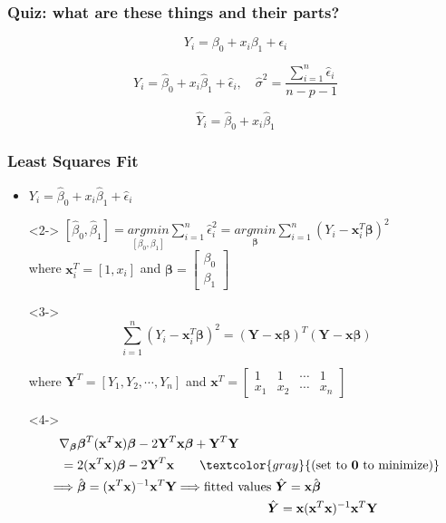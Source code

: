 \documentclass[xcolor={dvipsnames}]{beamer}
\begin{document}
\frame
{
 \frametitle{Quiz: what are these things and their parts?}
 \huge
$$ Y_i = \beta_0 + x_i \beta_1 + \epsilon_i $$

$$ Y_i = \hat \beta_0 + x_i \hat \beta_1 + \hat \epsilon_i, \quad \hat \sigma^2 = \frac{\sum_{i=1}^n \hat \epsilon_i}{n-p-1}$$

$$ \hat Y_i = \hat \beta_0 + x_i \hat \beta_1 $$

}

\frame
{
 \frametitle{Least Squares Fit}

\begin{itemize}

\item $ Y_i = \hat\beta_0 + x_i\hat\beta_1 + \hat \epsilon_i$
\item[] 
\item[]<2->  $[\hat \beta_0,\hat \beta_1] = \underset{[\beta_0, \beta_1]}{argmin} \sum_{i=1}^n \hat \epsilon_i^2 = 
\underset{{\boldsymbol\beta}}{argmin} \sum_{i=1}^n (Y_i - \textbf{x}_i^T{\boldsymbol\beta})^2$\\
\footnotesize
where $\textbf{x}_i^T = [1,x_i]$ and $\textbf{${\boldsymbol\beta}$} = \left[\begin{array}{c} \beta_0\\ \beta_1\end{array}\right]$

\item[]<3-> 
$$\sum_{i=1}^n ( Y_i - \textbf{x}_i^T{\boldsymbol\beta})^2 = (\textbf{Y} - \textbf{x}{\boldsymbol\beta})^T(\textbf{Y} - \textbf{x}{\boldsymbol\beta})$$

\footnotesize
where $\textbf{Y}^T =  [Y_1,Y_2,\cdots,Y_n]$ and $\textbf{x}^T =  \left[\begin{array}{cccc}1&1&\cdots&1\\x_1&x_2&\cdots&x_n \end{array}\right]$

\item[]<4-> \begin{align*}
\nabla_{{\boldsymbol\beta}} {} & {\boldsymbol\beta}^T(\textbf{x}^T\textbf{x}) {\boldsymbol\beta}  -2 \textbf{Y}^T \textbf{x}{\boldsymbol\beta}   + \textbf{Y}^T\textbf{Y}\\
=  {} &2 (\textbf{x}^T\textbf{x}) {\boldsymbol\beta}  - 2 \textbf{Y}^T\textbf{x} \quad\quad \textcolor{gray}{\text{(set to \textbf{0} to minimize)}}\\ 
\Longrightarrow {} & \hat{\boldsymbol\beta}  = (\textbf{x}^T\textbf{x})^{-1}  \textbf{x}^T\textbf{Y} \Longrightarrow 
\text{fitted values } \hat {\boldsymbol Y}  =  \textbf{x}\hat {\boldsymbol\beta}\\
& \quad\quad\quad\quad\quad\quad\quad\quad\quad\quad\quad\quad\quad\quad\quad   \hat {\boldsymbol Y}  =  \textbf{x}(\textbf{x}^T\textbf{x})^{-1}  \textbf{x}^T\textbf{Y}
\end{align*}

\end{itemize}
}
\end{document}
